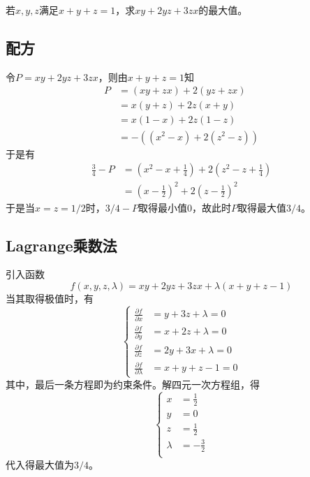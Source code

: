 

若$x, y, z$满足$x + y + z = 1$，求$xy + 2yz + 3zx$的最大值。


\subsection{配方}

令$P = xy + 2yz + 3zx$，则由$x + y + z = 1$知
\begin{align*}
  P &= (xy + zx) + 2(yz + zx) \\
  &= x(y + z) + 2z(x + y) \\
  &= x(1 - x) + 2z(1 - z) \\
  &= -\left(\left(x^2 - x\right) + 2\left(z^2 - z\right)\right)
\end{align*}
于是有
\begin{align*}
  \frac34 - P &= \left(x^2 - x + \frac14\right) + 2\left(z^2 - z + \frac14\right) \\
  &= \left(x - \frac12\right)^2 + 2\left(z - \frac12\right)^2
\end{align*}
于是当$x = z = 1/2$时，$3/4 - P$取得最小值0，故此时$P$取得最大值$3/4$。

\subsection{Lagrange乘数法}

引入函数
\[ f(x, y, z, \lambda) = xy + 2yz + 3zx + \lambda(x + y + z - 1) \]
当其取得极值时，有
\[ \left\{ \begin{aligned}
  \frac{\partial f}{\partial x} &= y + 3z + \lambda = 0 \\
  \frac{\partial f}{\partial y} &= x + 2z + \lambda = 0 \\
  \frac{\partial f}{\partial z} &= 2y + 3x + \lambda = 0 \\
  \frac{\partial f}{\partial \lambda} &= x + y + z - 1 = 0
\end{aligned} \right. \]
其中，最后一条方程即为约束条件。解四元一次方程组，得
\[ \left\{ \begin{aligned}
  x &= \frac12 \\
  y &= 0 \\
  z &= \frac12 \\
  \lambda &= -\frac32 \\
\end{aligned} \right. \]
代入得最大值为$3/4$。

